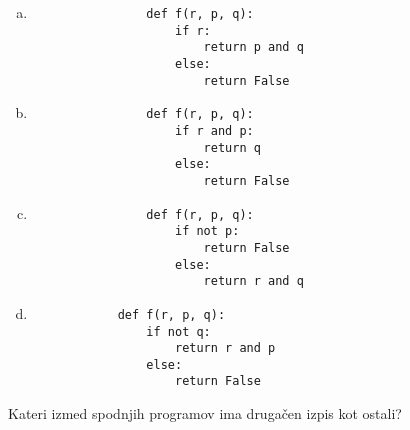 \documentclass[arhiv, 10pt]{../izpit}
\begin{document}
        \begin{multicols}{2}
        \begin{enumerate}[(a)]
\item 
                \begin{verbatim}
                def f(r, p, q):
                    if r:
                        return p and q
                    else:
                        return False
                \end{verbatim}
            
\item 
                \begin{verbatim}
                def f(r, p, q):
                    if r and p:
                        return q
                    else:
                        return False
                \end{verbatim}
            
\item 
                \begin{verbatim}
                def f(r, p, q):
                    if not p:
                        return False
                    else:
                        return r and q
                \end{verbatim}
            
\item 
            \begin{verbatim}
            def f(r, p, q):
                if not q:
                    return r and p
                else:
                    return False
            \end{verbatim}
        
\end{enumerate}

        \end{multicols}
    
        \naloga*
        
        Kateri izmed spodnjih programov ima drugačen izpis kot ostali?
    
\end{document}
